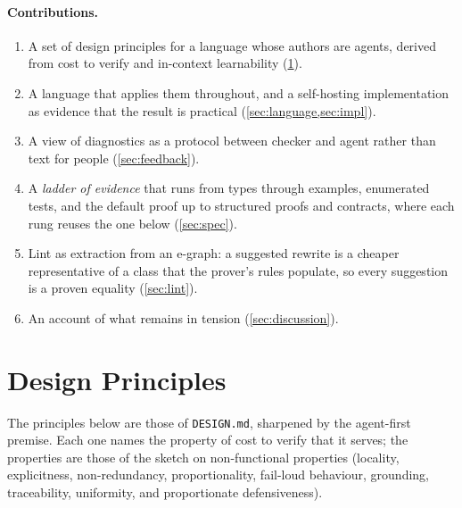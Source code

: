 \documentclass[11pt,a4paper]{article}
\newcommand{\file}[1]{\texttt{#1}}
\begin{document}
\paragraph{Contributions.}
\begin{enumerate}
\item A set of design principles for a language whose authors are agents, derived from cost to
  verify and in-context learnability (\cref{sec:principles}).
\item A language that applies them throughout, and a self-hosting implementation as evidence
  that the result is practical (\cref{sec:language,sec:impl}).
\item A view of diagnostics as a protocol between checker and agent rather than text for
  people (\cref{sec:feedback}).
\item A \emph{ladder of evidence} that runs from types through examples, enumerated tests,
  and the default proof up to structured proofs and contracts, where each rung reuses the one
  below (\cref{sec:spec}).
\item Lint as extraction from an e-graph: a suggested rewrite is a cheaper representative of
  a class that the prover's rules populate, so every suggestion is a proven equality
  (\cref{sec:lint}).
\item An account of what remains in tension (\cref{sec:discussion}).
\end{enumerate}

\section{Design Principles}\label{sec:principles}

The principles below are those of \file{DESIGN.md}, sharpened by the agent-first premise.
Each one names the property of cost to verify that it serves; the properties are those of
the sketch on non-functional properties (locality, explicitness, non-redundancy,
proportionality, fail-loud behaviour, grounding, traceability, uniformity, and proportionate
defensiveness).
\end{document}
